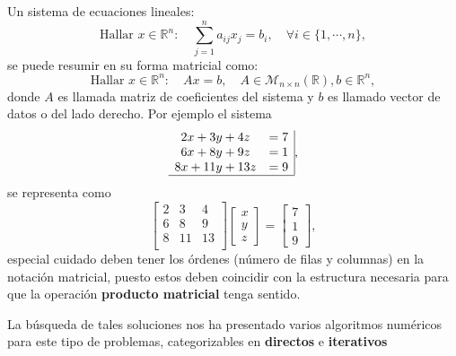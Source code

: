 \documentclass[11pt]{article}
\begin{document}
Un sistema de ecuaciones lineales:
$$
\text{Hallar } x\in \mathbb{R}^n:\quad  \sum_{j=1}^{n} a_{ij}x_j=b_i ,\quad \forall i\in\{1,\cdots,n\} ,
$$
se puede resumir en su forma matricial como:
$$
\text{Hallar } x\in \mathbb{R}^n:\quad  A x = b ,\quad  A\in \mathcal{M}_{n\times n }(\mathbb{R}), b\in \mathbb{R}^n,
$$
donde $A$ es llamada matriz de coeficientes del sistema y $b$ es llamado vector de datos o del lado derecho. Por ejemplo el sistema
$$
\begin{array}{cc|}
2x+3y+4z & =7\\
6x+8y+9z & =1 \\
8x+11y+13z &=9\\ 
\hline
\end{array},
$$
se representa como
$$
\begin{bmatrix}
2 & 3& 4 \\
6 & 8& 9 \\
8& 11 & 13 \\
\end{bmatrix}
\begin{bmatrix}
x \\ y\\ z
\end{bmatrix}
= 
\begin{bmatrix}
7\\1\\9
\end{bmatrix},
$$
especial cuidado deben tener los \'ordenes (n\'umero de filas y columnas) en la notaci\'on matricial, puesto estos deben coincidir con la estructura necesaria para que la operaci\'on \textbf{producto matricial} tenga sentido.

La b\'usqueda de tales soluciones nos ha presentado varios algoritmos num\'ericos para este tipo de problemas, categorizables en \textbf{directos} e \textbf{iterativos}
\end{document}
